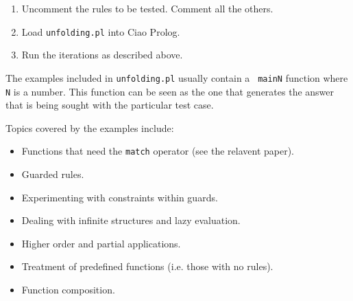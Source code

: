 \documentclass[11pt,a4paper,twoside,openright]{book}
\begin{document}
\begin{enumerate}
\item
Uncomment the rules to be tested. Comment all the others.

\item
Load {\tt unfolding.pl} into Ciao Prolog.

\item
Run the iterations as described above.
\end{enumerate}

\noindent
The examples included in {\tt unfolding.pl} usually contain a {\tt
  mainN} function where {\tt N} is a number. This function can be seen
as the one that generates the answer that is being sought with the
particular test case.

Topics covered by the examples include:

\begin{itemize}
\item
Functions that need the {\tt match} operator (see the relavent paper).

\item
Guarded rules.

\item
Experimenting with constraints within guards.

\item
Dealing with infinite structures and lazy evaluation.

\item
Higher order and partial applications.

\item
Treatment of predefined functions (i.e. those with no rules).

\item
Function composition.

\end{itemize}
\end{document}
